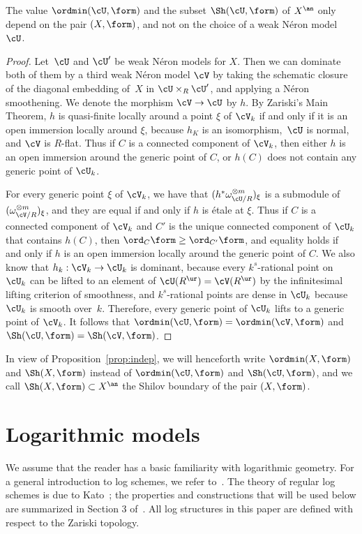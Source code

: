 \begin{prop}\label{prop:indep}
The value $\ordmin(\cU,\form)$ and the subset $\Sh(\cU,\form)$ of $X^{\an}$ only depend on the pair $(X,\form)$, and not on the choice of a weak Néron model~$\cU$.
\end{prop}
\begin{proof}
Let~$\cU$ and $\cU'$ be weak Néron models for $X$. Then we can dominate both of them by a third weak Néron model $\cV$ by taking
the schematic closure of the diagonal embedding of~$X$ in $\cU\times_R \cU'$, and applying a Néron smoothening. We denote the morphism $\cV\to \cU$ by $h$.
By Zariski's Main Theorem, $h$ is quasi-finite locally around a point $\xi$ of $\cV_k$ if and only if it is an open immersion locally around $\xi$, because $h_K$ is an isomorphism,~$\cU$ is normal, and $\cV$ is $R$\nobreakdash-flat. Thus if $C$ is a connected component of $\cV_k$, then either $h$ is an open immersion around the generic point of $C$, or $h(C)$ does not contain any generic point of $\cU_k$.

For every generic point $\xi$ of $\cV_k$, we have that $(h^*\omega^{\otimes m}_{\cU/R})_{\xi}$ is a submodule of $(\omega^{\otimes m}_{\cV/R})_{\xi}$, and they are equal if and only if
$h$ is étale at $\xi$.
Thus if $C$ is a connected component of $\cV_k$ and $C'$ is the unique connected component of $\cU_k$ that contains $h(C)$, then
$\ord_{C}\form\geq \ord_{C'}\form$, and equality holds if and only if $h$ is an open immersion locally around the generic point of $C$.
We also know that $h_k:\cV_k\to \cU_k$ is dominant, because every $k^s$-rational point on $\cU_k$ can be lifted to an element of $\cU(R^{\ur})=\cV(R^{\ur})$ by the infinitesimal lifting criterion of smoothness, and $k^s$-rational points are dense in $\cU_k$ because $\cU_k$ is smooth over~$k$.
Therefore, every generic point of $\cU_k$ lifts to a generic point of $\cV_k$.
It follows that $\ordmin(\cU,\form)=\ordmin(\cV,\form)$
and $\Sh(\cU,\form)=\Sh(\cV,\form)$.
\end{proof}

In view of Proposition~\ref{prop:indep}, we will henceforth write $\ordmin(X,\form)$ and $\Sh(X,\form)$ instead of $\ordmin(\cU,\form)$ and $\Sh(\cU,\form)$, and we call
$\Sh(X,\form)\subset X^{\an}$ the Shilov boundary of the pair $(X,\form)$.

\section{Logarithmic models}\label{sec:log}
We assume that the reader has a basic familiarity with logarithmic geometry. For a general introduction to log schemes, we refer to~\cite{kato-log}. The theory of regular log schemes is due to Kato~\cite{kato}; the properties and constructions that will be used below are summarized in Section 3 of~\cite{logzeta}. All log structures in this paper are defined with respect to the Zariski topology.
